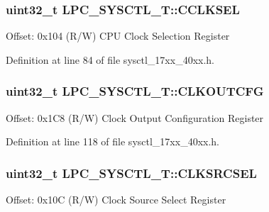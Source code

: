 \subsubsection[{\texorpdfstring{C\+C\+L\+K\+S\+EL}{CCLKSEL}}]{ uint32\+\_\+t L\+P\+C\+\_\+\+S\+Y\+S\+C\+T\+L\+\_\+\+T\+::\+C\+C\+L\+K\+S\+EL}\hypertarget{structLPC__SYSCTL__T_a5cebc138aa8f8591199efafea7bc316f}{}\label{structLPC__SYSCTL__T_a5cebc138aa8f8591199efafea7bc316f}
Offset\+: 0x104 (R/W) C\+PU Clock Selection Register 

Definition at line 84 of file sysctl\+\_\+17xx\+\_\+40xx.\+h.

\subsubsection[{\texorpdfstring{C\+L\+K\+O\+U\+T\+C\+FG}{CLKOUTCFG}}]{ uint32\+\_\+t L\+P\+C\+\_\+\+S\+Y\+S\+C\+T\+L\+\_\+\+T\+::\+C\+L\+K\+O\+U\+T\+C\+FG}\hypertarget{structLPC__SYSCTL__T_aebd09c67da35ee48eb53ef129aa2b76e}{}\label{structLPC__SYSCTL__T_aebd09c67da35ee48eb53ef129aa2b76e}
Offset\+: 0x1\+C8 (R/W) Clock Output Configuration Register 

Definition at line 118 of file sysctl\+\_\+17xx\+\_\+40xx.\+h.

\subsubsection[{\texorpdfstring{C\+L\+K\+S\+R\+C\+S\+EL}{CLKSRCSEL}}]{ uint32\+\_\+t L\+P\+C\+\_\+\+S\+Y\+S\+C\+T\+L\+\_\+\+T\+::\+C\+L\+K\+S\+R\+C\+S\+EL}\hypertarget{structLPC__SYSCTL__T_a0ddcaa3fe7ae45dfee7e17f6ec93138e}{}\label{structLPC__SYSCTL__T_a0ddcaa3fe7ae45dfee7e17f6ec93138e}
Offset\+: 0x10C (R/W) Clock Source Select Register 

